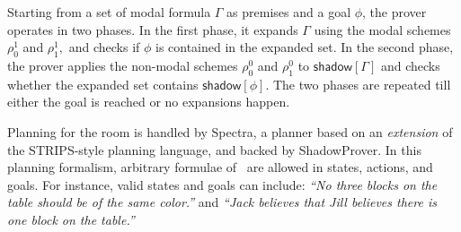 Starting from a set of modal formula $\Gamma$ as premises and a goal
$\phi$, the prover operates in two phases. In the first phase, it
expands $\Gamma$ using the modal schemes $\rho^1_{0}$ and
$\rho^1_{1}, $ and checks if $\phi$ is contained in the expanded
set. In the second phase, the prover applies the non-modal schemes
$\rho^0_{0} $ and $\rho^0_{1}$ to $\mathsf{shadow}[\Gamma]$ and checks whether
the expanded set contains $\mathsf{shadow}[\phi]$. The two phases are repeated
till either the goal is reached or no expansions happen.

Planning for the room is handled by \textsf{Spectra}, a planner based
on an \emph{extension} of the STRIPS-style
planning language, and backed by \textsf{ShadowProver}. In this planning formalism, arbitrary
formulae of \CEC\ are allowed in states, actions, and goals.  For
instance, valid states and goals can include: \emph{``No three blocks
on the table should be of the same color.''}  and \emph{``Jack
believes that Jill believes there is one block on the table.''}

